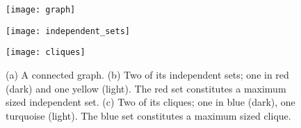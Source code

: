 \begin{figure}
	\centering
	\begin{minipage}{0.3\textwidth}
		\centering
		\texttt{[image: graph]}
		\subcaption{}
	\end{minipage}
	\begin{minipage}{0.3\textwidth}
		\centering
		\texttt{[image: independent\_sets]}
		\subcaption{}
	\end{minipage}
	\begin{minipage}{0.3\textwidth}
		\centering
		\texttt{[image: cliques]}
		\subcaption{}
	\end{minipage}
	\caption{(a) A connected  graph. (b) Two of its independent sets; one in red (dark) and one yellow (light). The red set constitutes a maximum sized independent set. (c) Two of its cliques; one in blue (dark), one  turquoise (light). The blue  set constitutes a maximum sized clique.}
	\label{fig:is+cliques}
\end{figure}

